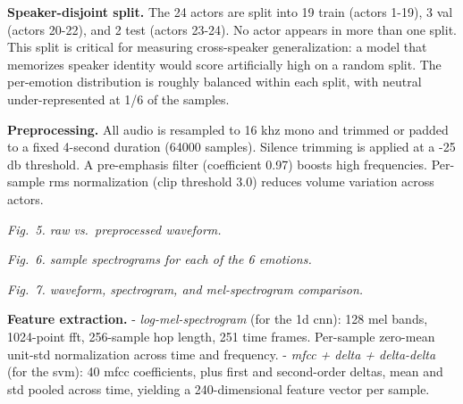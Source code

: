 \documentclass[conference]{IEEEtran}
\begin{document}
\textbf{Speaker-disjoint split.} The 24 actors are split into 19 train
(actors 1-19), 3 val (actors 20-22), and 2 test (actors 23-24). No actor
appears in more than one split. This split is critical for measuring
cross-speaker generalization: a model that memorizes speaker identity
would score artificially high on a random split. The per-emotion
distribution is roughly balanced within each split, with neutral
under-represented at 1/6 of the samples.

\textbf{Preprocessing.} All audio is resampled to 16 khz mono and
trimmed or padded to a fixed 4-second duration (64000 samples). Silence
trimming is applied at a -25 db threshold. A pre-emphasis filter
(coefficient 0.97) boosts high frequencies. Per-sample rms normalization
(clip threshold 3.0) reduces volume variation across actors.

\emph{Fig.~5. raw vs.~preprocessed waveform.}

\emph{Fig.~6. sample spectrograms for each of the 6 emotions.}

\emph{Fig.~7. waveform, spectrogram, and mel-spectrogram comparison.}

\textbf{Feature extraction.} - \emph{log-mel-spectrogram} (for the 1d
cnn): 128 mel bands, 1024-point fft, 256-sample hop length, 251 time
frames. Per-sample zero-mean unit-std normalization across time and
frequency. - \emph{mfcc + delta + delta-delta} (for the svm): 40 mfcc
coefficients, plus first and second-order deltas, mean and std pooled
across time, yielding a 240-dimensional feature vector per sample.
\end{document}
